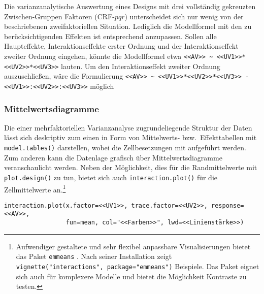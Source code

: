 Die varianzanalytische Auswertung eines Designs mit drei vollständig gekreuzten Zwischen-Gruppen Faktoren (CRF-$pqr$) unterscheidet sich nur wenig von der beschriebenen zweifaktoriellen Situation. Lediglich die Modellformel mit den zu berücksichtigenden Effekten ist entsprechend anzupassen. Sollen alle Haupteffekte, Interaktionseffekte erster Ordnung und der Interaktionseffekt zweiter Ordnung eingehen, könnte die Modellformel etwa \lstinline!<<AV>> ~ <<UV1>>*<<UV2>>*<<UV3>>! lauten. Um den Interaktionseffekt zweiter Ordnung auszuschließen, wäre die Formulierung \lstinline!<<AV>> ~ <<UV1>>*<<UV2>>*<<UV3>> - <<UV1>>:<<UV2>>:<<UV3>>! möglich

\subsubsection{Mittelwertsdiagramme}

Die einer mehrfaktoriellen Varianzanalyse zugrundeliegende Struktur der Daten lässt sich deskriptiv zum einen in Form von Mittelwerts- bzw.\ Effekttabellen mit \lstinline!model.tables()! darstellen, wobei die Zellbesetzungen mit aufgeführt werden. Zum anderen kann die Datenlage grafisch über Mittelwertsdiagramme veranschaulicht werden. Neben der Möglichkeit, dies für die Randmittelwerte mit \lstinline!plot.design()! zu tun, bietet sich auch \lstinline!interaction.plot()! für die Zellmittelwerte an.\footnote{\label{ftn:emmeans}Aufwendiger gestaltete und sehr flexibel anpassbare Visualisierungen bietet das Paket \lstinline!emmeans! \cite{Lenth2019}. Nach seiner Installation zeigt \lstinline!vignette("interactions", package="emmeans")! Beispiele. Das Paket eignet sich auch für komplexere Modelle und bietet die Möglichkeit Kontraste zu testen.}
\begin{lstlisting}
interaction.plot(x.factor=<<UV1>>, trace.factor=<<UV2>>, response=<<AV>>,
                 fun=mean, col="<<Farben>>", lwd=<<Linienstärke>>)
\end{lstlisting}

